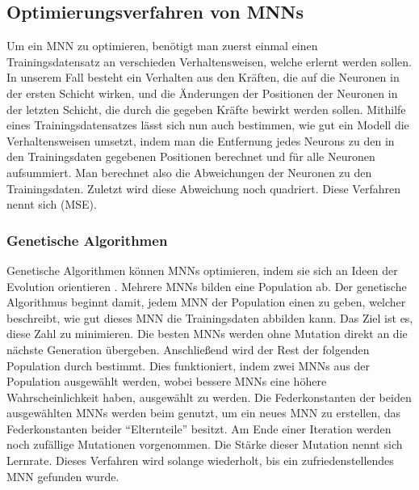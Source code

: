 


\subsection{Optimierungsverfahren von MNNs}

Um ein MNN zu optimieren, benötigt man zuerst einmal einen Trainingsdatensatz an verschieden Verhaltensweisen, welche erlernt werden sollen. In unserem Fall besteht ein Verhalten aus den Kräften, die auf die Neuronen in der ersten Schicht wirken, und die Änderungen der Positionen der Neuronen in der letzten Schicht, die durch die gegeben Kräfte bewirkt werden sollen. Mithilfe eines Trainingsdatensatzes lässt sich nun auch bestimmen, wie gut ein Modell die Verhaltensweisen umsetzt, indem man die Entfernung jedes Neurons zu den in den Trainingsdaten gegebenen Positionen berechnet und für alle Neuronen aufsummiert. Man berechnet also die Abweichungen der Neuronen zu den Trainingsdaten. Zuletzt wird diese Abweichung noch quadriert. Diese Verfahren nennt sich  (MSE).

\subsubsection{Genetische Algorithmen}

Genetische Algorithmen können MNNs optimieren, indem sie sich an Ideen der Evolution orientieren \cite{gentisch}. Mehrere MNNs bilden eine Population ab.
Der genetische Algorithmus beginnt damit, jedem MNN der Population einen  zu geben, welcher beschreibt, wie gut dieses MNN die Trainingsdaten abbilden kann. Das Ziel ist es, diese Zahl zu minimieren.
Die besten MNNs werden ohne Mutation direkt an die nächste Generation übergeben.
Anschließend wird der Rest der folgenden Population durch  bestimmt. Dies funktioniert, indem zwei MNNs aus der Population ausgewählt werden, wobei bessere MNNs eine höhere Wahrscheinlichkeit haben, ausgewählt zu werden.
Die Federkonstanten der beiden ausgewählten MNNs werden beim  genutzt, um ein neues MNN zu erstellen, das Federkonstanten beider \enquote{Elternteile} besitzt.
Am Ende einer Iteration werden noch zufällige Mutationen vorgenommen. Die Stärke dieser Mutation nennt sich Lernrate.
Dieses Verfahren wird solange wiederholt, bis ein zufriedenstellendes MNN gefunden wurde.

